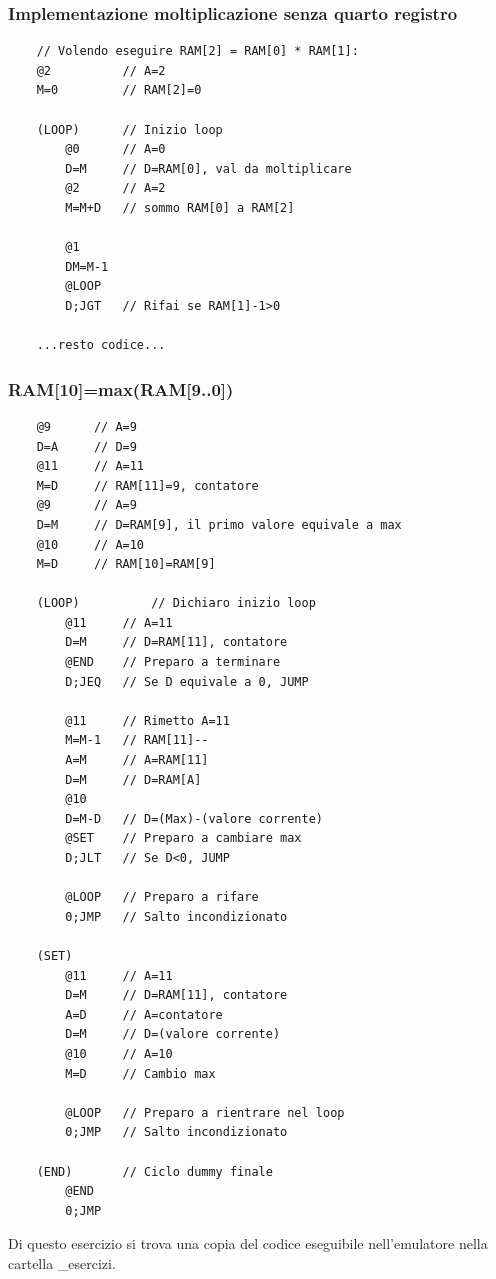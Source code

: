 \documentclass[12pt]{article}
\begin{document}
\subsubsection{Implementazione moltiplicazione senza quarto registro}
\begin{lstlisting}
    // Volendo eseguire RAM[2] = RAM[0] * RAM[1]:
    @2          // A=2
    M=0         // RAM[2]=0
    
    (LOOP)      // Inizio loop
        @0      // A=0
        D=M     // D=RAM[0], val da moltiplicare
        @2      // A=2
        M=M+D   // sommo RAM[0] a RAM[2]

        @1
        DM=M-1
        @LOOP
        D;JGT   // Rifai se RAM[1]-1>0
    
    ...resto codice...
\end{lstlisting}

\subsubsection{RAM[10]=max(RAM[9..0])}
\begin{lstlisting}
    @9      // A=9
    D=A     // D=9
    @11     // A=11
    M=D     // RAM[11]=9, contatore
    @9      // A=9
    D=M     // D=RAM[9], il primo valore equivale a max
    @10     // A=10
    M=D     // RAM[10]=RAM[9]
        
    (LOOP)          // Dichiaro inizio loop
        @11     // A=11
        D=M     // D=RAM[11], contatore
        @END    // Preparo a terminare
        D;JEQ   // Se D equivale a 0, JUMP

        @11     // Rimetto A=11
        M=M-1   // RAM[11]--
        A=M     // A=RAM[11]
        D=M     // D=RAM[A]
        @10
        D=M-D   // D=(Max)-(valore corrente)
        @SET    // Preparo a cambiare max
        D;JLT   // Se D<0, JUMP

        @LOOP   // Preparo a rifare
        0;JMP   // Salto incondizionato   

    (SET)
        @11     // A=11
        D=M     // D=RAM[11], contatore
        A=D     // A=contatore
        D=M     // D=(valore corrente)
        @10     // A=10
        M=D     // Cambio max
        
        @LOOP   // Preparo a rientrare nel loop
        0;JMP   // Salto incondizionato

    (END)       // Ciclo dummy finale
        @END
        0;JMP
\end{lstlisting}
Di questo esercizio si trova una copia del codice eseguibile nell'emulatore nella cartella \_esercizi.
\end{document}
